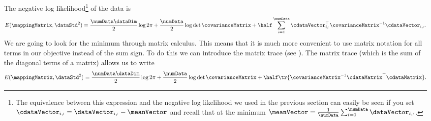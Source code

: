 The negative log likelihood\footnote{The equivalence between this
  expression and the negative log likelihood we used in the previous
  section can easily be seen if you set $\cdataVector_{i,
    :}=\dataVector_{i, :} - \meanVector$ and recall that at the
  minimum $\meanVector=\frac{1}{\numData}\sum_{i=1}^\numData
  \dataVector_{i, :}$.} of the data is
\[
E(\mappingMatrix, \dataStd^2) = \frac{\numData\dataDim}{2}\log 2\pi + \frac{\numData}{2}\log \det{\covarianceMatrix} + \half\sum_{i=1}^\numData\cdataVector_{i, :}^\top \covarianceMatrix^{-1} \cdataVector_{i, :}.
\]
We are going to look for the minimum through matrix calculus. This
means that it is much more convenient to use matrix notation for all
terms in our objective instead of the sum sign. To do this we can
introduce the matrix trace (see ). The matrix trace
(which is the sum of the diagonal terms of a matrix) allows us to
write
\[
E(\mappingMatrix, \dataStd^2) = \frac{\numData\dataDim}{2}\log 2\pi + \frac{\numData}{2}\log \det{\covarianceMatrix} + \half\tr{\covarianceMatrix^{-1} \cdataMatrix^\top \cdataMatrix}.
\]
